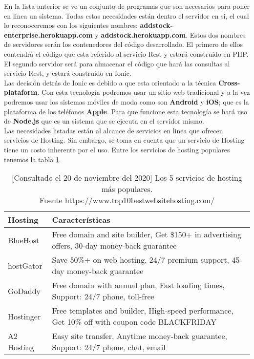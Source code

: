 En la lista anterior se ve un conjunto de programas que son necesarios para poner en linea un sistema. Todas estas necesidades están dentro el servidor en si, el cual lo reconoceremos con los siguientes nombres: \textbf{addstock-enterprise.herokuapp.com} y \textbf{addstock.herokuapp.com}. Estos dos nombres de servidores serán los contenedores del código desarrollado. El primero de ellos contendrá el código que esta referido al servicio Rest y estará construido en PHP. El segundo servidor será para almacenar el código que hará las consultas al servicio Rest, y estará construido en Ionic.\\

Las decisión detrás de Ionic es debido a que esta orientado a la técnica \textbf{Cross-plataform}. Con esta tecnología podremos usar un sitio web tradicional y a la vez podremos usar los sistemas móviles de moda como son \textbf{Android} y \textbf{iOS}; que es la plataforma de los teléfonos \textbf{Apple}. Para que funcione esta tecnología se hará uso de \textbf{Node.js} que es un sistema que se ejecuta en el servidor mismo.\\

Las necesidades listadas están al alcance de servicios en linea que ofrecen servicios de Hosting. Sin embargo, se toma en cuenta que un servicio de Hosting tiene un costo inherente por el uso. Entre los servicios de hosting populares tenemos la tabla \ref{tab:database-list}.

\begin{table}[H]
\centering
\begin{tabular}{p{2cm} p{5cm}}
\hline
\textbf{Hosting} & \textbf{Características} \\
\hline \hline
BlueHost & Free domain and site builder, Get \$150+ in advertising offers, 30-day money-back guarantee \\
\hline
hostGator & Save 50\%+ on web hosting, 24/7 premium support, 45-day money-back guarantee \\
\hline
GoDaddy & Free domain with annual plan, Fast loading times, Support: 24/7 phone, toll-free \\
\hline
Hostinger & Free templates and builder, High-speed performance, Get 10\% off with coupon code BLACKFRIDAY \\
\hline
A2 Hosting & Easy site transfer, Anytime money-back guarantee, Support: 24/7 phone, chat, email \\
\hline
\end{tabular}
\caption{[Consultado el 20 de noviembre del 2020] {Los 5 servicios de hosting más populares. \\ Fuente https://www.top10bestwebsitehosting.com/}}
\label{tab:database-list}
\end{table}

